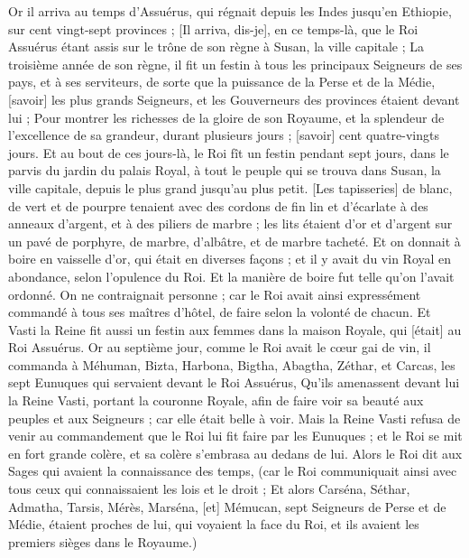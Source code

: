 \BFont
\begin{multicols}{2}
\VerseOne{}Or il arriva au temps d'Assuérus, qui régnait depuis les Indes jusqu'en Ethiopie, sur cent vingt-sept provinces ;
[Il arriva, dis-je], en ce temps-là, que le Roi Assuérus étant assis sur le trône de son règne à Susan, la ville capitale ;
La troisième année de son règne, il fit un festin à tous les principaux Seigneurs de ses pays, et à ses serviteurs, de sorte que la puissance de la Perse et de la Médie, [savoir] les plus grands Seigneurs, et les Gouverneurs des provinces étaient devant lui ;
Pour montrer les richesses de la gloire de son Royaume, et la splendeur de l'excellence de sa grandeur, durant plusieurs jours ; [savoir] cent quatre-vingts jours.
Et au bout de ces jours-là, le Roi fît un festin pendant sept jours, dans le parvis du jardin du palais Royal, à tout le peuple qui se trouva dans Susan, la ville capitale, depuis le plus grand jusqu'au plus petit.
[Les tapisseries] de blanc, de vert et de pourpre tenaient avec des cordons de fin lin et d'écarlate à des anneaux d'argent, et à des piliers de marbre ; les lits étaient d'or et d'argent sur un pavé de porphyre, de marbre, d'albâtre, et de marbre tacheté.
Et on donnait à boire en vaisselle d'or, qui était en diverses façons ; et il y avait du vin Royal en abondance, selon l'opulence du Roi.
Et la manière de boire fut telle qu'on l'avait ordonné. On ne contraignait personne ; car le Roi avait ainsi expressément commandé à tous ses maîtres d'hôtel, de faire selon la volonté de chacun.
Et Vasti la Reine fit aussi un festin aux femmes dans la maison Royale, qui [était] au Roi Assuérus.
Or au septième jour, comme le Roi avait le cœur gai de vin, il commanda à Méhuman, Bizta, Harbona, Bigtha, Abagtha, Zéthar, et Carcas, les sept Eunuques qui servaient devant le Roi Assuérus,
Qu'ils amenassent devant lui la Reine Vasti, portant la couronne Royale, afin de faire voir sa beauté aux peuples et aux Seigneurs ; car elle était belle à voir.
Mais la Reine Vasti refusa de venir au commandement que le Roi lui fit faire par les Eunuques ; et le Roi se mit en fort grande colère, et sa colère s'embrasa au dedans de lui.
Alors le Roi dit aux Sages qui avaient la connaissance des temps, (car le Roi communiquait ainsi avec tous ceux qui connaissaient les lois et le droit ;
Et alors Carséna, Séthar, Admatha, Tarsis, Mérès, Marséna, [et] Mémucan, sept Seigneurs de Perse et de Médie, étaient proches de lui, qui voyaient la face du Roi, et ils avaient les premiers sièges dans le Royaume.)

\end{multicols}
